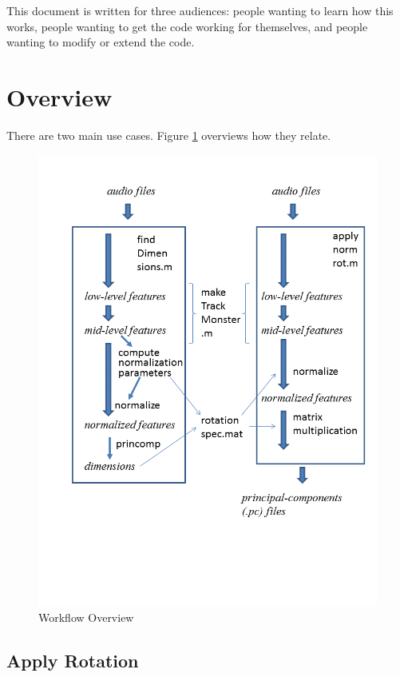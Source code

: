 \documentclass[11pt]{article}
\begin{document}
This document is written for three audiences: people wanting to learn
how this works, people wanting to get the code working for themselves,
and people wanting to modify or extend the code.


\section{Overview}

There are two main use cases.  Figure \ref{diagram} overviews how they
relate.

\begin{figure}[tp]
 \centerline{ 
 \includegraphics[width=11.4cm, trim = 1.cm 4.9cm 0cm 4.05cm, clip=true]{workflow-overview}
}
\caption{Workflow Overview}
\label{diagram}
\end{figure}


\subsection{Apply Rotation}    \label{applynormrot}
 
\end{document}
